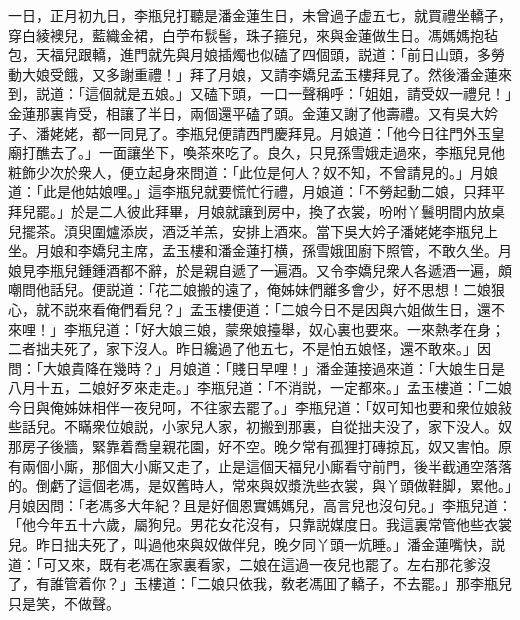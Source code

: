 一日，正月初九日，李瓶兒打聽是潘金蓮生日，未曾過子虚五七，就買禮坐轎子，穿白綾襖兒，藍織金裙，白苧布䯼髻，珠子箍兒，來與金蓮做生日。馮媽媽抱毡包，天福兒跟轎，進門就先與月娘插燭也似磕了四個頭，説道：「前日山頭，多勞動大娘受餓，又多謝重禮！」拜了月娘，又請李嬌兒孟玉樓拜見了。然後潘金蓮來到，説道：「這個就是五娘。」又磕下頭，一口一聲稱呼：「姐姐，請受奴一禮兒！」金蓮那裏肯受，相讓了半日，兩個還平磕了頭。金蓮又謝了他壽禮。又有吳大妗子、潘姥姥，都一同見了。李瓶兒便請西門慶拜見。月娘道：「他今日往門外玉皇廟打醮去了。」一面讓坐下，喚茶來吃了。良久，只見孫雪娥走過來，李瓶兒見他粧飾少次於衆人，便立起身來問道：「此位是何人？奴不知，不曾請見的。」月娘道：「此是他姑娘哩。」這李瓶兒就要慌忙行禮，月娘道：「不勞起動二娘，只拜平拜兒罷。」於是二人彼此拜畢，月娘就讓到房中，換了衣裳，吩咐丫鬟明間内放桌兒擺茶。湏臾圍爐添炭，酒泛羊羔，安排上酒來。當下吳大妗子潘姥姥李瓶兒上坐。月娘和李嬌兒主席，孟玉樓和潘金蓮打横，孫雪娥囬廚下照管，不敢久坐。月娘見李瓶兒鍾鍾酒都不辭，於是親自遞了一遍酒。又令李嬌兒衆人各遞酒一遍，頗嘲問他話兒。便説道：「花二娘搬的遠了，俺姊妹們離多會少，好不思想！二娘狠心，就不説來看俺們看兒？」孟玉樓便道：「二娘今日不是因與六姐做生日，還不來哩！」李瓶兒道：「好大娘三娘，蒙衆娘擡舉，奴心裏也要來。一來熱孝在身；二者拙夫死了，家下沒人。昨日纔過了他五七，不是怕五娘怪，還不敢來。」因問：「大娘貴降在幾時？」月娘道：「賤日早哩！」潘金蓮接過來道：「大娘生日是八月十五，二娘好歹來走走。」李瓶兒道：「不消説，一定都來。」孟玉樓道：「二娘今日與俺姊妹相伴一夜兒呵，不往家去罷了。」李瓶兒道：「奴可知也要和衆位娘敍些話兒。不瞞衆位娘説，小家兒人家，初搬到那裏，自從拙夫没了，家下没人。奴那房子後牆，緊靠着喬皇親花園，好不空。晚夕常有孤狸打磚掠瓦，奴又害怕。原有兩個小廝，那個大小廝又走了，止是這個天福兒小廝看守前門，後半截通空落落的。倒虧了這個老馮，是奴舊時人，常來與奴漿洗些衣裳，與丫頭做鞋脚，累他。」月娘因問：「老馮多大年紀？且是好個恩實媽媽兒，高言兒也沒句兒。」李瓶兒道：「他今年五十六歲，屬狗兒。男花女花沒有，只靠説媒度日。我這裏常管他些衣裳兒。昨日拙夫死了，叫過他來與奴做伴兒，晚夕同丫頭一炕睡。」潘金蓮嘴快，説道：「可又來，既有老馮在家裏看家，二娘在這過一夜兒也罷了。左右那花爹沒了，有誰管着你？」玉樓道：「二娘只依我，敎老馮囬了轎子，不去罷。」那李瓶兒只是笑，不做聲。


